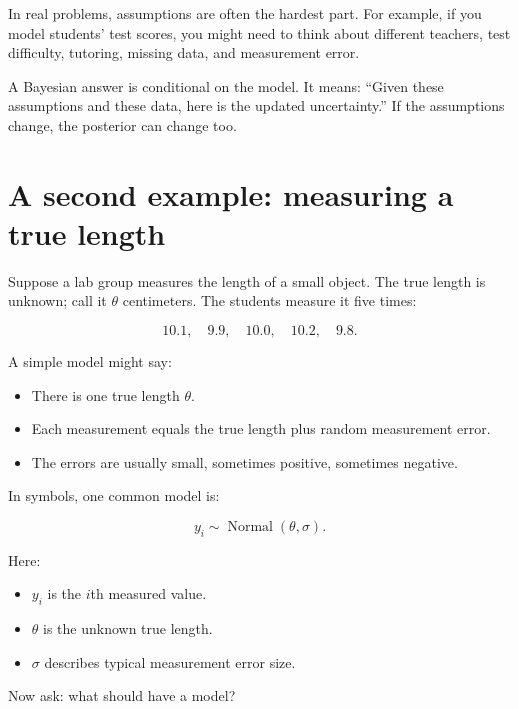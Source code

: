 \documentclass[11pt]{article}
\begin{document}
In real problems, assumptions are often the hardest part. For example, if you model students' test scores, you might need to think about different teachers, test difficulty, tutoring, missing data, and measurement error.

\begin{bigidea}
A Bayesian answer is conditional on the model. It means: ``Given these assumptions and these data, here is the updated uncertainty.'' If the assumptions change, the posterior can change too.
\end{bigidea}

\section{A second example: measuring a true length}

Suppose a lab group measures the length of a small object. The true length is unknown; call it $\theta$ centimeters. The students measure it five times:

\[
10.1,\quad 9.9,\quad 10.0,\quad 10.2,\quad 9.8.
\]

A simple model might say:

\begin{itemize}[leftmargin=1.5em]
  \item There is one true length $\theta$.
  \item Each measurement equals the true length plus random measurement error.
  \item The errors are usually small, sometimes positive, sometimes negative.
\end{itemize}

In symbols, one common model is:

\[
y_i \sim \operatorname{Normal}(\theta,\sigma).
\]

Here:

\begin{itemize}[leftmargin=1.5em]
  \item $y_i$ is the $i$th measured value.
  \item $\theta$ is the unknown true length.
  \item $\sigma$ describes typical measurement error size.
\end{itemize}

Now ask: what should have a model?
\end{document}
